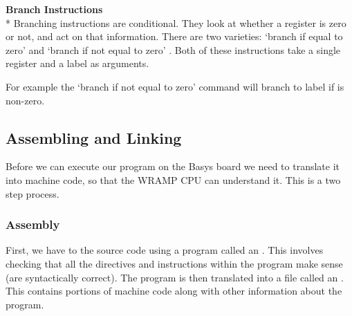 \textbf{Branch Instructions}\\*
Branching instructions are conditional. They look at whether a
register is zero or not, and act on that information. There are two
varieties: `branch if equal to zero'  and `branch if not
equal to zero' . Both of these instructions take a single
register and a label as arguments.

For example the `branch if not equal to zero' command
 will branch to label  if
 is non-zero.

\begin{comment}
\subsection{I/O Routines}

In the example program you will see we have used the routines
\src{putstr}, \src{readnum} and \src{writenum} to perfrom input
and output. These routines are in the file \LIBEXTWO, which we will 
\BI{link} to. Here is an overview of the routines:
\begin{description}
\item[\src{putstr}] is used to write a string to the Linux machine. Put the
address of the string into register \reg{2}.
\item[\src{readnum}] reads a number from the Linux machine, leaving it in
register \reg{1}.
\item[\src{writenum}] will write the number in register \reg{2} to the 
Linux machine.
\end{description}
\end{comment}

\subsection{Assembling and Linking}
Before we can execute our program on the Basys board we need to translate it 
into machine code, so that the WRAMP CPU can understand it. This is a two
step process.

\subsubsection{Assembly}
First, we have to  the source code using a program
called an . This involves checking that all the
directives and instructions within the program make sense (are
syntactically correct). The program is then translated into a file
called an . This contains portions of machine code
along with other information about the program.


